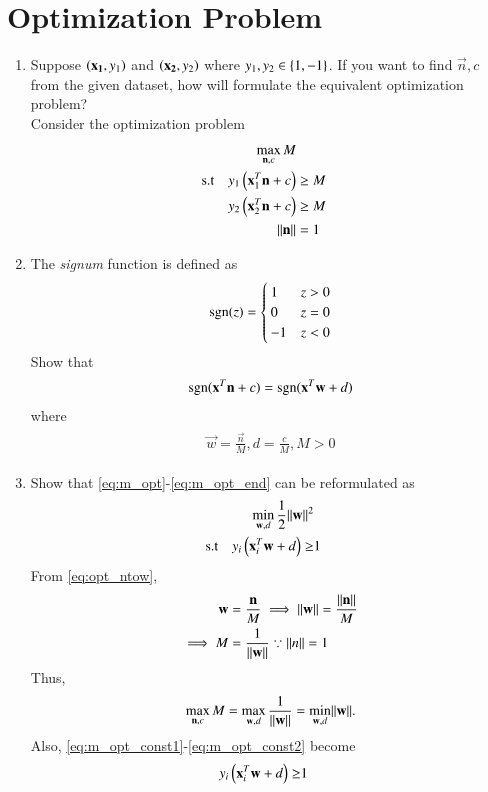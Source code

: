 \documentclass[journal,12pt,twocolumn]{IEEEtran}
\renewcommand\thesection{\arabic{section}}
\begin{document}
\section{Optimization Problem}
\begin{enumerate}[label=\thesection.\arabic*,ref=\thesection.\theenumi]

\item Suppose $\left(\mathbf{x_1},y_1\right)$ and $\left(\mathbf{x_2},y_2\right)$ where $y_1, y_2 \in \left\{1,-1\right\}$. If you want 
to find $\vec{n},c$ from the given dataset, how will formulate the equivalent 
optimization 
problem?
\\
\solution
 Consider the optimization problem
\begin{align}
\label{eq:m_opt}
\max_{\mathbf{n},c}M
\\
\label{eq:m_opt_const1}
\text{s.t} \quad y_1\left(\mathbf{x}_1^T\mathbf{n}+c\right) &\ge M
\\
\label{eq:m_opt_const2}
y_2\left(\mathbf{x}_2^T\mathbf{n}+c\right) &\ge M
\\
\lVert\mathbf{n}\rVert &= 1
\label{eq:m_opt_end}
\end{align}
\item The {\em signum} function is defined as
\begin{align}
\mathop{\mathrm{sgn}}(z) = 
\begin{cases}
1  & z > 0
\\
0  & z = 0
\\
-1  & z < 0
\end{cases}
\end{align}
Show that
%
\begin{align}
\mathop{\mathrm{sgn}}(\mathbf{x}^T\mathbf{n}+c) = \mathop{\mathrm{sgn}}(\mathbf{x}^T\mathbf{w}+d)
\end{align}
%
where
\begin{align}
\begin{split}
\vec{w} = \frac{\vec{n}}{M}, 
d = \frac{c}{M}, M >0
\end{split}
\label{eq:opt_ntow}
\end{align}

\item Show that \eqref{eq:m_opt}-\eqref{eq:m_opt_end} can be reformulated as
%
\begin{align}
\label{eq:opt_w}
\min_{\mathbf{w},d}\frac{1}{2}\lVert\mathbf{w}\rVert^2
\\
\text{s.t} \quad  y_i\left(\mathbf{x}_i^T\mathbf{w}+d\right) \ge&1
\end{align}
\solution From \eqref{eq:opt_ntow},
\begin{align}
\mathbf{w} &= \frac{\mathbf{n}}{M} \implies 
 \lVert\mathbf{w}\rVert = \frac{\lVert\mathbf{n}\rVert}{M} 
\\
\implies M &= \frac{1}{\lVert\mathbf{w}\rVert} \because \lVert n\rVert = 1
\end{align}
Thus, 
\begin{align}
\max_{\mathbf{n},c}M = \max_{\mathbf{w},d}\frac{1}{\lVert\mathbf{w}\rVert}=\min_{\mathbf{w},d}\lVert\mathbf{w}\rVert.
\end{align}
Also, \eqref{eq:m_opt_const1}-\eqref{eq:m_opt_const2} become
\begin{align}
y_i\left(\mathbf{x}_i^T\mathbf{w}+d\right) \ge&1
\end{align}


\end{enumerate}
\end{document}
